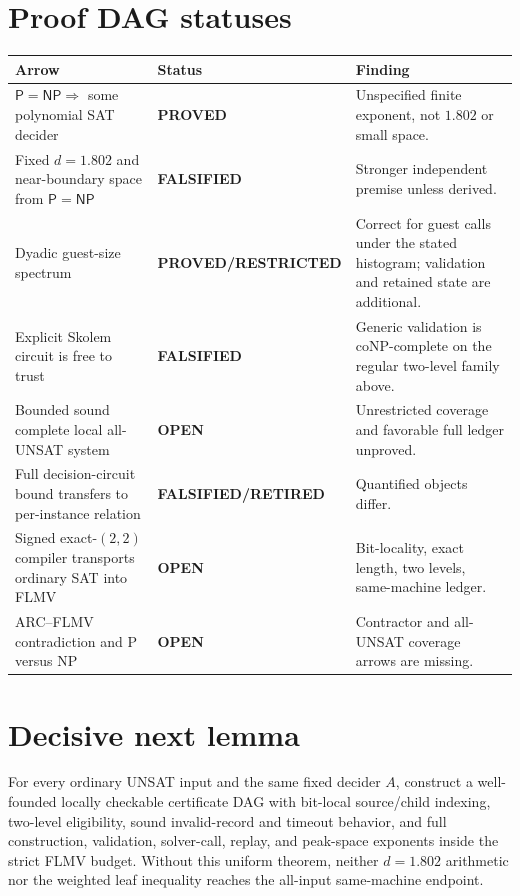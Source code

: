 \documentclass[11pt]{article}
\newcommand{\status}[1]{\textbf{#1}}
\begin{document}
\section*{Proof DAG statuses}
\begin{center}
\begin{tabularx}{\textwidth}{@{}p{}p{}X@{}}
\toprule
Arrow & Status & Finding\\
\midrule
$\mathsf P=\mathsf{NP}\Rightarrow$ some polynomial SAT decider
& \status{PROVED} & Unspecified finite exponent, not $1.802$ or small space.\\
Fixed $d=1.802$ and near-boundary space from $\mathsf P=\mathsf{NP}$
& \status{FALSIFIED} & Stronger independent premise unless derived.\\
Dyadic guest-size spectrum
& \status{PROVED/RESTRICTED} & Correct for guest calls under the stated
histogram; validation and retained state are additional.\\
Explicit Skolem circuit is free to trust
& \status{FALSIFIED} & Generic validation is coNP-complete on the regular
two-level family above.\\
Bounded sound complete local all-UNSAT system
& \status{OPEN} & Unrestricted coverage and favorable full ledger unproved.\\
Full decision-circuit bound transfers to per-instance relation
& \status{FALSIFIED/RETIRED} & Quantified objects differ.\\
Signed exact-$(2,2)$ compiler transports ordinary SAT into FLMV
& \status{OPEN} & Bit-locality, exact length, two levels, same-machine ledger.\\
ARC--FLMV contradiction and P versus NP
& \status{OPEN} & Contractor and all-UNSAT coverage arrows are missing.\\
\bottomrule
\end{tabularx}
\end{center}

\section*{Decisive next lemma}
For every ordinary UNSAT input and the same fixed decider $A$, construct a
well-founded locally checkable certificate DAG with bit-local source/child
indexing, two-level eligibility, sound invalid-record and timeout behavior,
and full construction, validation, solver-call, replay, and peak-space
exponents inside the strict FLMV budget.  Without this uniform theorem,
neither $d=1.802$ arithmetic nor the weighted leaf inequality reaches the
all-input same-machine endpoint.
\end{document}

